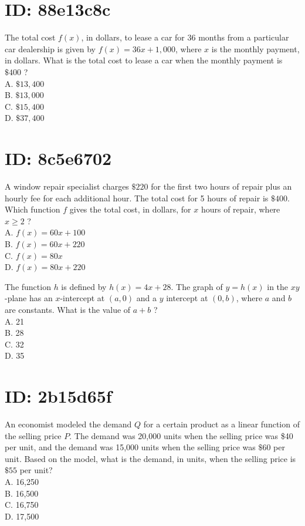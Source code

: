 

\section*{ID: 88e13c8c}
The total cost $f(x)$, in dollars, to lease a car for 36 months from a particular car dealership is given by $f(x)=36 x+1,000$, where $x$ is the monthly payment, in dollars. What is the total cost to lease a car when the monthly payment is $\$ 400$ ?\\
A. $\$ 13,400$\\
B. $\$ 13,000$\\
C. $\$ 15,400$\\
D. $\$ 37,400$

\section*{ID: 8c5e6702}
A window repair specialist charges $\$ 220$ for the first two hours of repair plus an hourly fee for each additional hour. The total cost for 5 hours of repair is $\$ 400$. Which function $f$ gives the total cost, in dollars, for $x$ hours of repair, where $x \geq 2$ ?\\
A. $f(x)=60 x+100$\\
B. $f(x)=60 x+220$\\
C. $f(x)=80 x$\\
D. $f(x)=80 x+220$

The function $h$ is defined by $h(x)=4 x+28$. The graph of $y=h(x)$ in the $x y$-plane has an $x$-intercept at $(a, 0)$ and a $y$ intercept at $(0, b)$, where $a$ and $b$ are constants. What is the value of $a+b$ ?\\
A. 21\\
B. 28\\
C. 32\\
D. 35

\section*{ID: 2b15d65f}
An economist modeled the demand $Q$ for a certain product as a linear function of the selling price $P$. The demand was 20,000 units when the selling price was \$40 per unit, and the demand was 15,000 units when the selling price was $\$ 60$ per unit. Based on the model, what is the demand, in units, when the selling price is $\$ 55$ per unit?\\
A. 16,250\\
B. 16,500\\
C. 16,750\\
D. 17,500

